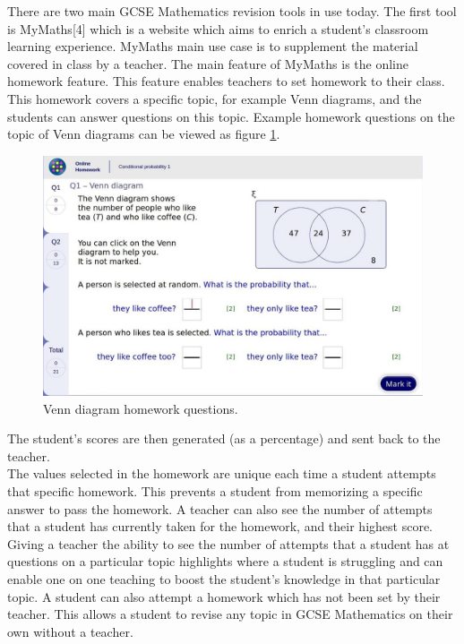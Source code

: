 \documentclass{article}
\begin{document}
There are two main GCSE Mathematics revision tools in use today. The first tool is MyMaths[4] which is a website which aims to enrich a student's classroom learning experience. MyMaths main use case is to supplement the material covered in class by a teacher. The main feature of MyMaths is the online homework feature. This feature enables teachers to set homework to their class. This homework covers a specific topic, for example Venn diagrams, and the students can answer questions on this topic. Example homework questions on the topic of Venn diagrams can be viewed as figure \ref{figure:mymathsHomeworkQuestion1}.
\begin{figure}[H]
	\centering
	\includegraphics[width=0.9\linewidth]{./data/mymathsQuestion1.jpg}
	\caption{Venn diagram homework questions.}
	\label{figure:mymathsHomeworkQuestion1}
\end{figure}
The student's scores are then generated (as a percentage) and sent back to the teacher. \\

The values selected in the homework are unique each time a student attempts that specific homework. This prevents a student from memorizing a specific answer to pass the homework. A teacher can also see the number of attempts that a student has currently taken for the homework, and their highest score. Giving a teacher the ability to see the number of attempts that a student has at questions on a particular topic highlights where a student is struggling and can enable one on one teaching to boost the student's knowledge in that particular topic. A student can also attempt a homework which has not been set by their teacher. This allows a student to revise any topic in GCSE Mathematics on their own without a teacher. \\
\end{document}
